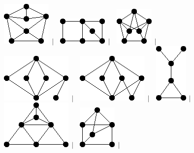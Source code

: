 \documentclass[11pt,paper=b5,footinclude,headinclude]{scrbook} %
\newtheorem{ex}{Vaja\hypertarget{sol:\theex}}[chapter]
\begin{document}
\begin{ex}
\begin{figure}
\includegraphics[scale=0.5]{smallGraphs/g_X89.png}$\,\mid\,$\
\includegraphics[scale=0.5]{smallGraphs/g_X9.png}$\,\mid\,$\
\includegraphics[scale=0.5]{smallGraphs/g_X90.png}$\,\mid\,$\
\includegraphics[scale=0.5]{smallGraphs/g_X92.png}$\,\mid\,$\
\includegraphics[scale=0.5]{smallGraphs/g_X93.png}$\,\mid\,$\
\includegraphics[scale=0.5]{smallGraphs/g_X95.png}$\,\mid\,$\
\includegraphics[scale=0.5]{smallGraphs/g_X97.png}$\,\mid\,$\
\includegraphics[scale=0.5]{smallGraphs/g_X98.png}$\,\mid\,$\

\end{figure}
\end{ex}
\end{document}
